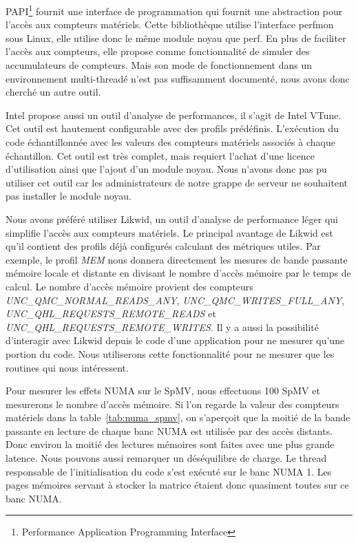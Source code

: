 PAPI\footnote{Performance Application Programming Interface} fournit une interface de programmation qui fournit une abstraction pour l'accès aux compteurs matériels.
%
Cette bibliothèque utilise l'interface perfmon sous Linux, elle utilise donc le même module noyau que perf.
%
En plus de faciliter l'accès aux compteurs, elle propose comme fonctionnalité de simuler des accumulateurs de compteurs.
%
Mais son mode de fonctionnement dans un environnement multi-threadé n'est pas suffisamment documenté, nous avons donc cherché un autre outil.



Intel propose aussi un outil d'analyse de performances, il s'agit de Intel VTune.
%
Cet outil est hautement configurable avec des profils prédéfinis.
%
L'exécution du code échantillonnée avec les valeurs des compteurs matériels associés à chaque échantillon.
%
Cet outil est très complet, mais requiert l'achat d'une licence d'utilisation ainsi que l'ajout d'un module noyau.
%
Nous n'avons donc pas pu utiliser cet outil car les administrateurs de notre grappe de serveur ne souhaitent pas installer le module noyau.



Nous avons préféré utiliser Likwid, un outil d'analyse de performance léger qui simplifie l'accès aux compteurs matériels.
%
Le principal avantage de Likwid est qu'il contient des profils déjà configurés calculant des métriques utiles.
%
Par exemple, le profil {\em MEM} nous donnera directement les mesures de bande passante mémoire locale et distante en divisant le nombre d'accès mémoire par le temps de calcul.
%
Le nombre d'accès mémoire provient des compteurs {\em UNC\_QMC\_NORMAL\_READS\_ANY}, {\em UNC\_QMC\_WRITES\_FULL\_ANY}, {\em UNC\_QHL\_REQUESTS\_REMOTE\_READS} et {\em UNC\_QHL\_REQUESTS\_REMOTE\_WRITES}.
%
Il y a aussi la possibilité d'interagir avec Likwid depuis le code d'une application pour ne mesurer qu'une portion du code.
%
Nous utiliserons cette fonctionnalité pour ne mesurer que les routines qui nous intéressent.



Pour mesurer les effets NUMA sur le SpMV, nous effectuons 100 SpMV et mesurerons le nombre d'accès mémoire.
%
Si l'on regarde la valeur des compteurs matériels dans la table~\ref{tab:numa_spmv}, on s'aperçoit que la moitié de la bande passante en lecture de chaque banc NUMA est utilisée par des accès distants.
%
Donc environ la moitié des lectures mémoires sont faites avec une plus grande latence.
%
Nous pouvons aussi remarquer un déséquilibre de charge.
%
Le thread responsable de l'initialisation du code s'est exécuté sur le banc NUMA 1.
%
Les pages mémoires servant à stocker la matrice étaient donc quasiment toutes sur ce banc NUMA.

